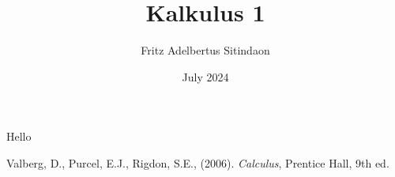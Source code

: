 \documentclass{article}
\title{Kalkulus 1}
\author{Fritz Adelbertus Sitindaon}
\date{July 2024}
\newcommand{\ds}{\displaystyle}
\begin{document}



% 
% 
% 
% 
% 

% 
% 
Hello


\begin{thebibliography}{9}
Valberg, D., Purcel, E.J., Rigdon, S.E., (2006). \emph{Calculus}, Prentice Hall, 9th ed.
\end{thebibliography}
\end{document}
